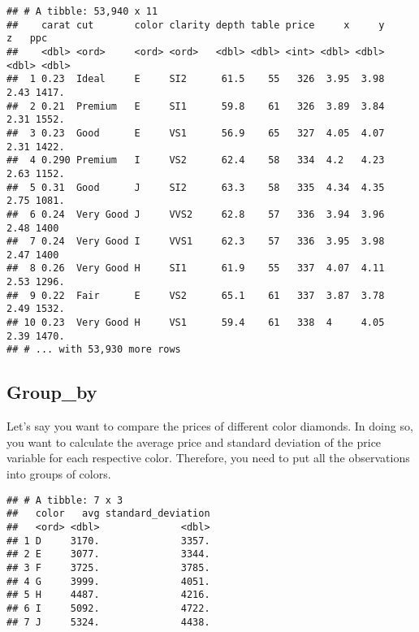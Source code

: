 \documentclass[]{article}
\newenvironment{Shaded}{\begin{snugshade}}{\end{snugshade}}
\newcommand{\KeywordTok}[1]{\textcolor[rgb]{0.13,0.29,0.53}{\textbf{#1}}}
\newcommand{\DataTypeTok}[1]{\textcolor[rgb]{0.13,0.29,0.53}{#1}}
\newcommand{\StringTok}[1]{\textcolor[rgb]{0.31,0.60,0.02}{#1}}
\newcommand{\OperatorTok}[1]{\textcolor[rgb]{0.81,0.36,0.00}{\textbf{#1}}}
\newcommand{\NormalTok}[1]{#1}
\begin{document}
\begin{verbatim}
## # A tibble: 53,940 x 11
##    carat cut       color clarity depth table price     x     y     z   ppc
##    <dbl> <ord>     <ord> <ord>   <dbl> <dbl> <int> <dbl> <dbl> <dbl> <dbl>
##  1 0.23  Ideal     E     SI2      61.5    55   326  3.95  3.98  2.43 1417.
##  2 0.21  Premium   E     SI1      59.8    61   326  3.89  3.84  2.31 1552.
##  3 0.23  Good      E     VS1      56.9    65   327  4.05  4.07  2.31 1422.
##  4 0.290 Premium   I     VS2      62.4    58   334  4.2   4.23  2.63 1152.
##  5 0.31  Good      J     SI2      63.3    58   335  4.34  4.35  2.75 1081.
##  6 0.24  Very Good J     VVS2     62.8    57   336  3.94  3.96  2.48 1400 
##  7 0.24  Very Good I     VVS1     62.3    57   336  3.95  3.98  2.47 1400 
##  8 0.26  Very Good H     SI1      61.9    55   337  4.07  4.11  2.53 1296.
##  9 0.22  Fair      E     VS2      65.1    61   337  3.87  3.78  2.49 1532.
## 10 0.23  Very Good H     VS1      59.4    61   338  4     4.05  2.39 1470.
## # ... with 53,930 more rows
\end{verbatim}

\subsection{Group\_by}\label{group_by}

Let's say you want to compare the prices of different color diamonds. In
doing so, you want to calculate the average price and standard deviation
of the price variable for each respective color. Therefore, you need to
put all the observations into groups of colors.

\begin{Shaded}
\end{Shaded}

\begin{verbatim}
## # A tibble: 7 x 3
##   color   avg standard_deviation
##   <ord> <dbl>              <dbl>
## 1 D     3170.              3357.
## 2 E     3077.              3344.
## 3 F     3725.              3785.
## 4 G     3999.              4051.
## 5 H     4487.              4216.
## 6 I     5092.              4722.
## 7 J     5324.              4438.
\end{verbatim}
\end{document}
